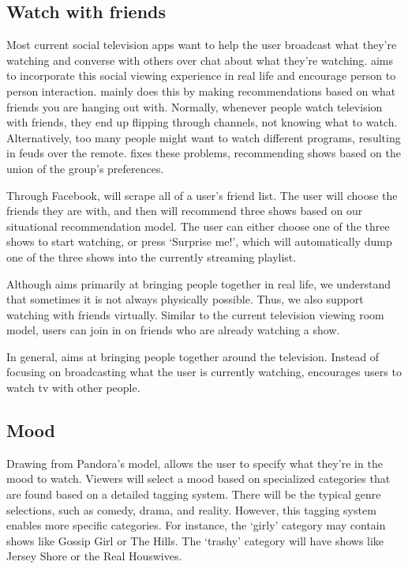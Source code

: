 \subsection{Watch with friends}
Most current social television apps want to help the user broadcast
what they’re watching and converse with others over chat about what
they’re watching.  {\sys} aims to incorporate this social viewing
experience in real life and encourage person to person interaction.
{\sys} mainly does this by making recommendations based on what
friends you are hanging out with.  Normally, whenever people watch
television with friends, they end up flipping through channels, not
knowing what to watch.  Alternatively, too many people might want to
watch different programs, resulting in feuds over the remote.  {\sys}
fixes these problems, recommending shows based on the union of the
group’s preferences.

Through Facebook, {\sys} will scrape all of a user’s friend list.  The
user will choose the friends they are with, and then {\sys} will
recommend three shows based on our situational recommendation model.
The user can either choose one of the three shows to start watching,
or press ‘Surprise me!’, which will automatically dump one of the
three shows into the currently streaming playlist.

Although {\sys} aims primarily at bringing people together in real
life, we understand that sometimes it is not always physically
possible.  Thus, we also support watching with friends virtually.
Similar to the current television viewing room model, users can join
in on friends who are already watching a show.

In general, {\sys} aims at bringing people together around the
television.  Instead of focusing on broadcasting what the user is
currently watching, {\sys} encourages users to watch tv with other
people.

\subsection{Mood}
Drawing from Pandora’s model, {\sys} allows the user to specify what
they’re in the mood to watch.  Viewers will select a mood based on
specialized categories that are found based on a detailed tagging
system.  There will be the typical genre selections, such as comedy,
drama, and reality.  However, this tagging system enables more
specific categories.  For instance, the ‘girly’ category may contain
shows like Gossip Girl or The Hills.  The ‘trashy’ category will have
shows like Jersey Shore or the Real Houswives.

